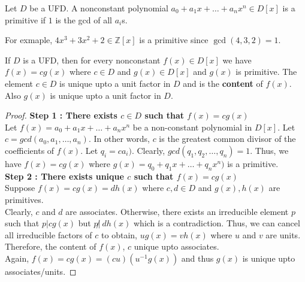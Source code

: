 \begin{definition}[primitive]
	Let $D$ be a UFD.
	A nonconstant polynomial $a_0 + a_1x + \dots + a_nx^n \in D[x]$ is a primitive if $1$ is the gcd of all $a_i$s.
\end{definition}
	For exmaple, $4x^3+3x^2+2 \in \mathbb{Z}[x]$ is a primitive since $\gcd(4,3,2) = 1$.

\begin{lemma}
	If $D$ is a UFD, then for every nonconstant $f(x) \in D[x]$ we have $f(x) = cg(x)$ where $c \in D$ and $g(x) \in D[x]$ and $g(x)$ is primitive.
	The element $c \in D$ is unique upto a unit factor in $D$ and is the \textbf{content} of $f(x)$.
	Also $g(x)$ is unique upto a unit factor in $D$.
\end{lemma}
\begin{proof}
	\textbf{Step 1 : There exists $c \in D$ such that $f(x) = cg(x)$}\\
	Let $f(x) = a_0 + a_1x + \dots +a_nx^n$ be a non-constant polynomial in $D[x]$.
	Let $c = gcd(a_0,a_1,\dots,a_n)$.
	In other words, $c$ is the greatest common divisor of the coefficients of $f(x)$.
	Let $q_i = ca_i)$.
	Clearly, $gcd(q_1,q_2,\dots,q_n) = 1$.
	Thus, we have $f(x) = cg(x)$ where $g(x) = q_0+q_1x+\dots+q_nx^n)$ is a primitive.\\

	\textbf{Step 2 : There exists unique $c$ such that  $f(x) = cg(x)$}\\
	Suppose $f(x) = cg(x) = dh(x)$ where $c,d \in D$ and $g(x), h(x)$ are primitives.\\

	Clearly, $c$ and $d$ are associates.
	Otherwise, there exists an irreducible element $p$ such that $p | cg(x)$ but $p\!\not|\ dh(x)$ which is a contradiction.
	Thus, we can cancel all irreducible factors of $c$ to obtain, $ug(x) = vh(x)$ where $u$ and $v$ are units.
	Therefore, the content of $f(x)$, $c$ unique upto associates.\\

	Again, $f(x) = cg(x) = (cu) (u^{-1}g(x))$ and thus $g(x)$ is unique upto associates/units.
\end{proof}

